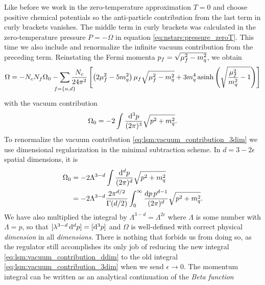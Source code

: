 Like before we work in the zero-temperature approximation $T=0$ and choose positive chemical potentials so the anti-particle contribution from the last term in curly brackets vanishes.
The middle term in curly brackets was calculated in the zero-temperature pressure $P=-\Omega$ in equation \eqref{eq:nstars:pressure_zeroT}.
This time we also include and renormalize the infinite vacuum contribution from the preceding term.
Reinstating the Fermi momenta $p_f = \sqrt{\smash[b]{\mu_f^2-m_q^2}}$, we obtain
\begin{equation}
	\Omega = -N_c N_f \Omega_0 - \smashoperator{\sum_{\vphantom{\big|} f=\{u,d\}}} \frac{N_c}{24 \pi^2} \left[ \left( 2 \mu_f^2 - 5 m_q^2 \right) \mu_f \sqrt{\mu_f^2 - m_q^2} + 3 m_q^4 \asinh \left( \sqrt{\frac{\mu_{\smash{f}}^2}{m_q^2}-1} \right) \right]
\end{equation}
with the vacuum contribution
\begin{equation}
	\Omega_0 = -2 \int \frac{\mathop{}\!\mathrm{d}^3 p}{(2 \pi)^3} \sqrt{p^2 + m_q^2}.
\label{eq:lsm:vacuum_contribution_3dim}
\end{equation}
To renormalize the vacuum contribution \eqref{eq:lsm:vacuum_contribution_3dim} we use dimensional regularization in the minimal subtraction scheme.
In $d = 3 - 2 \epsilon$ spatial dimensions, it is
\begin{equation}
\begin{split}
	\Omega_0 &= -2 \Lambda^{3-d} \int \frac{\mathop{}\!\mathrm{d}^d p}{(2 \pi)^d} \sqrt{p^2 + m_q^2} \\
	         &= -2 \Lambda^{3-d} \frac{2 \pi^{d/2}}{\Gamma(d/2)} \int_0^\infty \frac{\mathop{}\!\mathrm{d} p \, p^{d-1}}{(2 \pi)^d} \sqrt{p^2 + m_q^2} .
\end{split}
\label{eq:lsm:vacuum_contribution_ddim}
\end{equation}
We have also multiplied the integral by $\Lambda^{3-d} = \Lambda^{2\epsilon}$ where $\Lambda$ is some number with $\unit{\Lambda} = \unit{p}$,
so that $[\lambda^{3-d} \mathop{}\!\mathrm{d}^d p] = [\mathop{}\!\mathrm{d}^3 p]$ and $\Omega$ is well-defined with correct physical \emph{dimension} in all \emph{dimensions}.
There is nothing that forbids us from doing so,
as the regulator still accomplishes its only job of reducing the new integral \eqref{eq:lsm:vacuum_contribution_ddim} to the old integral \eqref{eq:lsm:vacuum_contribution_3dim} when we send $\epsilon \rightarrow 0$.
The momentum integral can be written as an analytical continuation of the \emph{Beta function} \cite{ref:beta_function}
